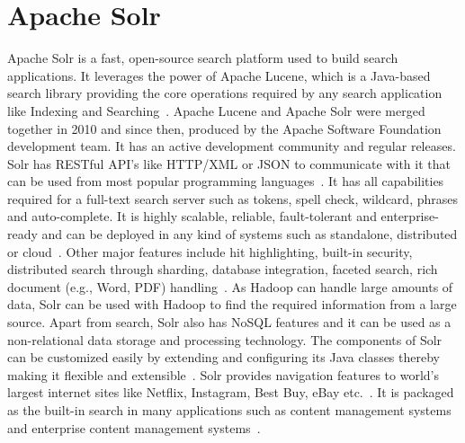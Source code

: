 \section{Apache Solr}

Apache Solr is a fast, open-source search platform used
to build search applications. It leverages the power of Apache
Lucene, which is a Java-based search library providing the core
operations required by any search application like Indexing and
Searching~\cite{hid-sp18-516-www-tutorialspoint-solr}. Apache Lucene and Apache
Solr were merged together in 2010 and since then, produced by the Apache
Software Foundation development team. It has an active development community and
regular releases. Solr has RESTful API's like HTTP/XML or JSON to
communicate with it that can be used from most popular programming
languages~\cite{hid-sp18-516-www-wiki-solr}. It has all capabilities required
for a full-text search server such as tokens, spell check, wildcard, phrases and
auto-complete. It is highly scalable, reliable, fault-tolerant and
enterprise-ready and can be deployed in any kind of systems such as standalone,
distributed or cloud~\cite{hid-sp18-516-www-tutorialspoint-solr}. Other major
features include hit highlighting, built-in security, distributed search through
sharding, database integration, faceted search, rich document (e.g., Word, PDF)
handling~\cite{hid-sp18-516-www-wiki-solr}. As Hadoop can handle large amounts
of data, Solr can be used with Hadoop to find the required information from a
large source. Apart from search, Solr also has NoSQL features and it can be used
as a non-relational data storage and processing technology. The components of
Solr can be customized easily by extending and configuring its Java classes
thereby making it flexible and
extensible~\cite{hid-sp18-516-www-tutorialspoint-solr}. Solr provides navigation
features to world's largest internet sites like Netflix, Instagram, Best Buy,
eBay etc.~\cite{hid-sp18-516-www-apacheorg-solr}. It is packaged as the built-in
search in many applications such as content management systems and enterprise
content management systems~\cite{hid-sp18-516-www-wiki-solr}.
